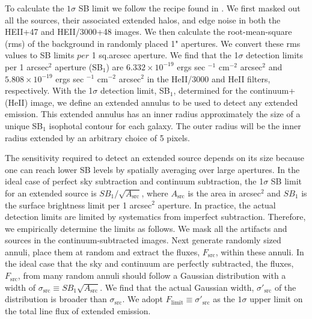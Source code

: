\documentclass[twocolumn]{aastex61}
\begin{document}
To calculate the $1\sigma$ SB limit we follow the recipe found in \cite{Battaia_2015}. We first masked out all the sources, their associated extended halos, and edge noise in both the HEII+47 and HEII/3000+48 images. We then calculate the root-mean-square (rms) of the background in randomly placed 1" apertures. We convert these rms values to SB limits $per$ 1 sq.arcsec aperture. We find that the 1$\sigma$ detection limits per 1 arcsec$^2$ aperture (SB$_1$) are $6.332\times10^{-19}$ ergs sec $^{-1}$ cm$^{-2}$ arcsec$^2$ and $5.808\times10^{-19} $ ergs sec $^{-1}$ cm$^{-2}$ arcsec$^2$ in the HeII/3000 and HeII filters, respectively. With the 1$\sigma$ detection limit, SB$_1$, determined for the continuum+ (HeII) image, we define an extended annulus to be used to detect any extended  emission. This extended annulus has an inner radius approximately the size of a unique SB$_1$ isophotal contour for each galaxy. The outer radius will be the inner radius extended by an arbitrary choice of 5 pixels.

The sensitivity required to detect an extended source depends on its size because one can reach lower SB levels by spatially averaging over large apertures. In the ideal case of perfect sky subtraction and continuum subtraction, the 1$\sigma$ SB limit for an extended source is $SB_{1}/\sqrt{A_\text{src}}$, where $A_\text{src}$ is the area in arcsec$^2$ and $SB_{1}$ is the surface brightness limit per 1 arcsec$^2$ aperture. In practice, the actual detection limits are limited by systematics from imperfect subtraction. Therefore, we empirically determine the limits as follows. We mask all the artifacts and sources in the continuum-subtracted images. Next generate randomly sized annuli, place them at random and extract the fluxes, $F_{\text{src}}$, within these annuli. In the ideal case that the sky and continuum are perfectly subtracted, the fluxes, $F_{\text{src}}$, from many random annuli should follow a Gaussian distribution with a width of $\sigma_{\text{src}} \equiv SB_{1}\sqrt{A_\text{src}}$. We find that the actual Gaussian width, $\sigma'_{\text{src}}$ of the distribution is broader than $\sigma_{\text{src}}$. We adopt $F_{\text{limit}} \equiv \sigma'_{\text{src}}$  as the $1 \sigma$ upper limit on the total line flux of extended  emission. 
\end{document}

